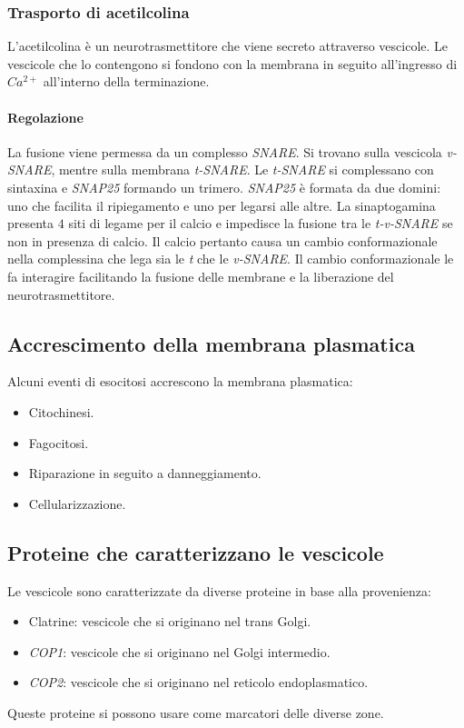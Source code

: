 		\subsubsection{Trasporto di acetilcolina}
		L'acetilcolina \`e un neurotrasmettitore che viene secreto attraverso vescicole.
		Le vescicole che lo contengono si fondono con la membrana in seguito all'ingresso di \emph{$Ca^{2+}$} all'interno della terminazione.

			\paragraph{Regolazione}
			La fusione viene permessa da un complesso \emph{SNARE}.
			Si trovano sulla vescicola \emph{v-SNARE}, mentre sulla membrana \emph{t-SNARE}.
			Le \emph{t-SNARE} si complessano con sintaxina e \emph{SNAP25} formando un trimero.
			\emph{SNAP25} \`e formata da due domini: uno che facilita il ripiegamento e uno per legarsi alle altre.
			La sinaptogamina presenta $4$ siti di legame per il calcio e impedisce la fusione tra le \emph{t-v-SNARE} se non in presenza di calcio.
			Il calcio pertanto causa un cambio conformazionale nella complessina che lega sia le \emph{t} che le \emph{v-SNARE}.
			Il cambio conformazionale le fa interagire facilitando la fusione delle membrane e la liberazione del neurotrasmettitore.

	\subsection{Accrescimento della membrana plasmatica}
	Alcuni eventi di esocitosi accrescono la membrana plasmatica:
	\begin{multicols}{2}
		\begin{itemize}
			\item Citochinesi.
			\item Fagocitosi.
			\item Riparazione in seguito a danneggiamento.
			\item Cellularizzazione.
		\end{itemize}
	\end{multicols}

	\subsection{Proteine che caratterizzano le vescicole}
	Le vescicole sono caratterizzate da diverse proteine in base alla provenienza:
	\begin{multicols}{2}
		\begin{itemize}
			\item Clatrine: vescicole che si originano nel trans Golgi.
			\item \emph{COP1}: vescicole che si originano nel Golgi intermedio.
			\item \emph{COP2}: vescicole che si originano nel reticolo endoplasmatico.
		\end{itemize}
	\end{multicols}
	Queste proteine si possono usare come marcatori delle diverse zone.

